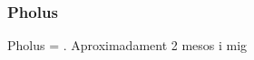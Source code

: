 \documentclass{beamer}
\begin{document}
\begin{frame}
	\frametitle{Pholus}

	Pholus = . Aproximadament 2 mesos i mig
\end{frame}
\end{document}

